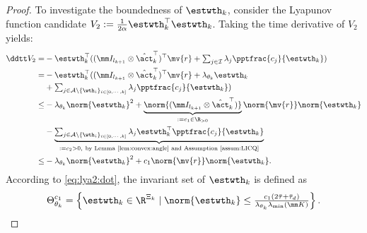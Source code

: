 \documentclass[lettersize,journal]{IEEEtran}
\newcommand*{\fe}{\mv{r}}
\begin{document}
\begin{proof}
To investigate the boundedness of $\estwth_k$, consider the Lyapunov function candidate $V_2:=\tfrac{1}{2\alpha}\estwth_k^\top \estwth_k$.
Taking the time derivative of $V_2$ yields:
\begin{equation}
    \begin{aligned}
        \ddtt  V_2 
        =& 
        -\estwth_k^\top 
        (
            (\mm I_{l_{k+1}}\otimes \hat\act_k^\top)^\top
            \fe
            +
            \textstyle\sum_{j\in\mathcal{I}}
            \lambda_j 
            \pptfrac{c_j}{\estwth_k}
        )
        \\
        =&
        -\estwth_k^\top 
        (
            (\mm I_{l_{k+1}}\otimes \hat\act_k^\top)^\top
            \fe
            +
            \lambda_{\theta_k}\estwth_k
        \\
        &
            +
            \textstyle\sum_{
                j\in\mathcal{A}\setminus \{\wth_i\}_{i\in[0,\cdots,k]}
            }
            \lambda_j 
            \pptfrac{c_j}{\estwth_k}
        )
        \\
        \le&
        -
        \lambda_{\theta_k}\norm{\estwth_k}^2
        +
        \underbrace{
            \norm{(\mm I_{l_{k+1}}\otimes \hat\act_k^\top)}
        }_{:=c_1\in\R_{>0}}
        \norm{\fe}
        \norm{\estwth_k}
        \\
        &
        -
        \underbrace{
        \textstyle\sum_{
            j\in\mathcal{A}\setminus \{\wth_i\}_{i\in[0,\cdots,k]}
        }
        \lambda_j 
        \estwth_k^\top \pptfrac{c_j}{\estwth_k}
        }_{:= c_2 >0,\ \text{by Lemma \ref{lem:convex:angle} and Assumption \ref{assum:LICQ}}}
        \\
        \le&
        -
        \lambda_{\theta_k}\norm{\estwth_k}^2
        +
        c_1     
        \norm{\fe}
        \norm{\estwth_k}
        .
    \end{aligned}
    \label{eq:lya2:dot}
\end{equation}
According to \eqref{eq:lya2:dot}, the invariant set of $\estwth_k$ is defined as
\begin{equation}
    \Theta_{\theta_k}^{c_1} 
    = 
    \left\{ 
        \estwth_k \in \R^{\Xi_{k}} 
        \mid 
        \norm{\estwth_k} 
        \le 
        \tfrac{
            c_1(2\bar\tau+\bar\tau_d)
        }{
            \lambda_{\theta_k}\lambda_\text{min}(\mm K)
        }
    \right\}
    .
    \label{eq:invariant:c1:wth}
\end{equation}


\end{proof}
\end{document}
